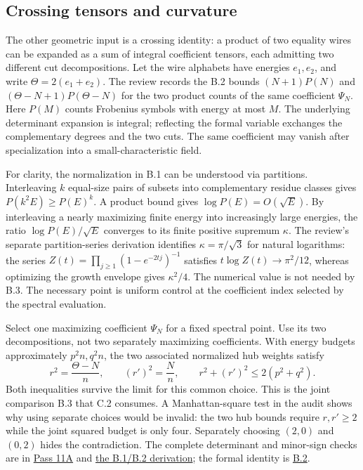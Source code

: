 \documentclass[11pt,letterpaper]{article}
\theoremstyle{definition}\newtheorem{definition}[theorem]{Definition}\newtheorem{example}[theorem]{Example}
\theoremstyle{remark}\newtheorem{remark}[theorem]{Remark}
\newcommand{\pub}[3]{\href{https://github.com/anthropics/formal-math/blob/11b6c7e3c927df2658f513b6b68ea7f8929c62c5/vp-vnp/#1\#L#2}{#3}}
\newcommand{\aud}[2]{\href{https://github.com/nousentllc/VP-VNP-Review/blob/567303d0bcf4f9d54390437b137752446e58ccd6/#1}{#2}}
\begin{document}
\subsection{Crossing tensors and curvature}\label{sec:curvature}
The other geometric input is a crossing identity: a product of two equality wires can be expanded as a sum of integral coefficient tensors, each admitting two different cut decompositions. Let the wire alphabets have energies $e_1,e_2$, and write $\Theta=2(e_1+e_2)$. The review records the B.2 bounds $(N+1)P(N)$ and $(\Theta-N+1)P(\Theta-N)$ for the two product counts of the same coefficient $\Psi_N$. Here $P(M)$ counts Frobenius symbols with energy at most $M$. The underlying determinant expansion is integral; reflecting the formal variable exchanges the complementary degrees and the two cuts. The same coefficient may vanish after specialization into a small-characteristic field.

For clarity, the normalization in B.1 can be understood via partitions. Interleaving $k$ equal-size pairs of subsets into complementary residue classes gives $P(k^2E)\ge P(E)^k$. A product bound gives $\log P(E)=O(\sqrt E)$. By interleaving a nearly maximizing finite energy into increasingly large energies, the ratio $\log P(E)/\sqrt E$ converges to its finite positive supremum $\kappa$. The review's separate partition-series derivation identifies $\kappa=\pi/\sqrt3$ for natural logarithms: the series $Z(t)=\prod_{j\ge1}(1-e^{-2tj})^{-1}$ satisfies $t\log Z(t)\to\pi^2/12$, whereas optimizing the growth envelope gives $\kappa^2/4$. The numerical value is not needed by B.3. The necessary point is uniform control at the coefficient index selected by the spectral evaluation.

Select one maximizing coefficient $\Psi_N$ for a fixed spectral point. Use its two decompositions, not two separately maximizing coefficients. With energy budgets approximately $p^2 n,q^2 n$, the two associated normalized hub weights satisfy
\[
 r^2=\frac{\Theta-N}{n},\qquad (r')^2=\frac{N}{n},\qquad
 r^2+(r')^2\le2(p^2+q^2).
\]
Both inequalities survive the limit for this common choice. This is the joint comparison B.3 that C.2 consumes. A Manhattan-square test in the audit shows why using separate choices would be invalid: the two hub bounds require $r,r'\ge2$ while the joint squared budget is only four. Separately choosing $(2,0)$ and $(0,2)$ hides the contradiction. The complete determinant and minor-sign checks are in \aud{passes/11a-crossing.md}{Pass 11A} and \aud{report/VP_VNP_Research_Review.pdf}{the B.1/B.2 derivation}; the formal identity is \pub{Paper/Identity.lean}{699}{B.2}.
\end{document}
